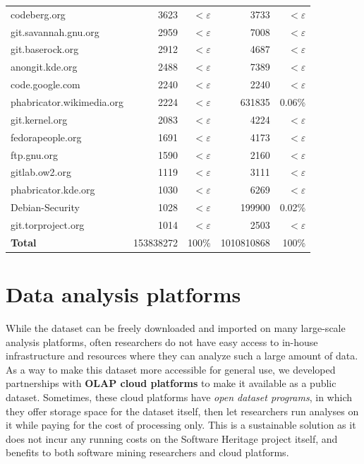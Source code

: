 \begin{table}
\begin{tabular}{l|rr|rr}
        codeberg.org              & \num{3623}      & $<\varepsilon$ & \num{3733}       & $<\varepsilon$ \\
        git.savannah.gnu.org      & \num{2959}      & $<\varepsilon$ & \num{7008}       & $<\varepsilon$ \\
        git.baserock.org          & \num{2912}      & $<\varepsilon$ & \num{4687}       & $<\varepsilon$ \\
        anongit.kde.org           & \num{2488}      & $<\varepsilon$ & \num{7389}       & $<\varepsilon$ \\
        code.google.com           & \num{2240}      & $<\varepsilon$ & \num{2240}       & $<\varepsilon$ \\
        phabricator.wikimedia.org & \num{2224}      & $<\varepsilon$ & \num{631835}     & 0.06\% \\
        git.kernel.org            & \num{2083}      & $<\varepsilon$ & \num{4224}       & $<\varepsilon$ \\
        fedorapeople.org          & \num{1691}      & $<\varepsilon$ & \num{4173}       & $<\varepsilon$ \\
        ftp.gnu.org               & \num{1590}      & $<\varepsilon$ & \num{2160}       & $<\varepsilon$ \\
        gitlab.ow2.org            & \num{1119}      & $<\varepsilon$ & \num{3111}       & $<\varepsilon$ \\
        phabricator.kde.org       & \num{1030}      & $<\varepsilon$ & \num{6269}       & $<\varepsilon$ \\
        Debian-Security           & \num{1028}      & $<\varepsilon$ & \num{199900}     & 0.02\% \\
        git.torproject.org        & \num{1014}      & $<\varepsilon$ & \num{2503}       & $<\varepsilon$ \\
        \hline
        \textbf{Total}            & \num{153838272} & 100\%       & \num{1010810868} & 100\% \\
  \end{tabular}
\end{table}

\section{Data analysis platforms}

While the dataset can be freely downloaded and imported on many large-scale
analysis platforms, often researchers do not have easy access to in-house
infrastructure and resources where they can analyze such a large amount of
data.
As a way to make this dataset more accessible for general use, we developed
partnerships with \textbf{\gls{OLAP} cloud platforms} to make it available as
a public dataset. Sometimes, these cloud platforms have \emph{open dataset
programs}, in which they offer storage space for the dataset itself, then
let researchers run analyses on it while paying for the cost of processing
only. This is a sustainable solution as it does not incur any running costs on
the Software Heritage project itself, and benefits to both software mining
researchers and cloud platforms.

